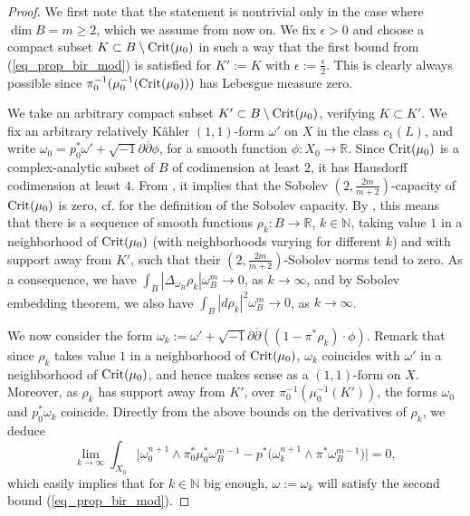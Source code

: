 \documentclass[12pt]{article}
\numberwithin{equation}{section}
\theoremstyle{theorem}
\theoremstyle{definition}
\theoremstyle{remark}
\newcommand{\imun} {\sqrt{-1}}
\newcommand{\real}{\mathbb{R}}
\newcommand{\nat}{\mathbb{N}}
\newcommand{\dbar}{ \overline{\partial} }
\begin{document}
	\begin{proof}
		We first note that the statement is nontrivial only in the case where $\dim B = m \geq 2$, which we assume from now on.
		We fix $\epsilon > 0$ and choose a compact subset $K \subset B \setminus {\rm{Crit}}(\mu_0)$ in such a way that the first bound from (\ref{eq_prop_bir_mod}) is satisfied for $K' := K$ with $\epsilon := \frac{\epsilon}{2}$.
		This is clearly always possible since $\pi_0^{-1}(\mu_0^{-1} ({\rm{Crit}}(\mu_0)))$ has Lebesgue measure zero.
		\par 
		We take an arbitrary compact subset $K' \subset B \setminus {\rm{Crit}}(\mu_0)$, verifying $K \subset K'$.
		We fix an arbitrary relatively Kähler $(1, 1)$-form $\omega'$ on $X$ in the class $c_1(L)$, and write $\omega_0 = p_0^* \omega' + \imun \partial \dbar \phi$, for a smooth function $\phi : X_0 \to \real$.
		Since ${\rm{Crit}}(\mu_0)$ is a complex-analytic subset of $B$ of codimension at least $2$, it has Hausdorff codimension at least $4$.
		From \cite[Theorem 5.1.9]{AdansHedberg}, it implies that the Sobolev $(2, \frac{2m}{m + 2})$-capacity of ${\rm{Crit}}(\mu_0)$ is zero, cf. \cite[Definition 2.2.1]{AdansHedberg} for the definition of the Sobolev capacity.
		By \cite[Definition 2.7.1, Corollary 3.3.4 and p. 208]{AdansHedberg}, this means that there is a sequence of smooth functions $\rho_k : B \to \real$, $k \in \nat$, taking value $1$ in a neighborhood of ${\rm{Crit}}(\mu_0)$ (with neighborhoods varying for different $k$) and with support away from $K'$, such that their $(2, \frac{2m}{m + 2})$-Sobolev norms tend to zero. 
		As a consequence, we have $\int_B |\Delta_{\omega_B} \rho_k| \omega_B^m \to 0$, as $k \to \infty$, and by Sobolev embedding theorem, we also have $\int_B |d \rho_k|^2 \omega_B^m \to 0$, as $k \to \infty$.
		\par 
		We now consider the form $\omega_k := \omega' + \imun \partial \dbar ((1 - \pi^* \rho_k) \cdot \phi)$.
		Remark that since $\rho_k$ takes value $1$ in a neighborhood of ${\rm{Crit}}(\mu_0)$, $\omega_k$ coincides with $\omega'$ in a neighborhood of ${\rm{Crit}}(\mu_0)$, and hence makes sense as a $(1, 1)$-form on $X$.
		Moreover, as $\rho_k$ has support away from $K'$, over $\pi_0^{-1}(\mu_0^{-1}(K'))$, the forms $\omega_0$ and $p_0^* \omega_k$ coincide.
		Directly from the above bounds on the derivatives of $\rho_k$, we deduce
		\begin{equation}
			\lim_{k \to \infty} \int_{X_0} \Big| \omega_0^{n + 1} \wedge \pi_0^* \mu_0^* \omega_B^{m - 1} - p^* \big( \omega_k^{n + 1} \wedge \pi^* \omega_B^{m - 1} \big) \Big| = 0, 
		\end{equation}
		which easily implies that for $k \in \nat$ big enough, $\omega := \omega_k$ will satisfy the second bound (\ref{eq_prop_bir_mod}).
	\end{proof}
	
\end{document}
